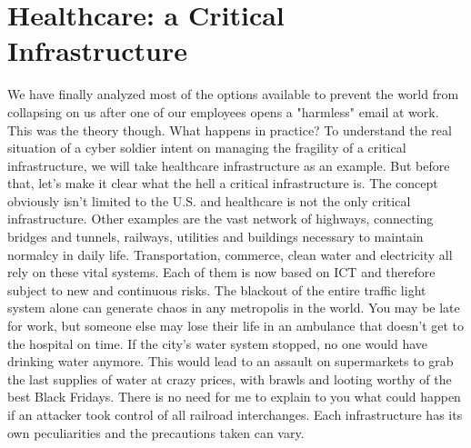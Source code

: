\chapter{Healthcare: a Critical Infrastructure}
We have finally analyzed most of the options available to prevent the world from collapsing on us after one of our employees opens a "harmless" email at work. This was the theory though. What happens in practice? To understand the real situation of a cyber soldier intent on managing the fragility of a critical infrastructure, we will take healthcare infrastructure as an example. But before that, let's make it clear what the hell a critical infrastructure is.
The concept obviously isn't limited to the U.S. and healthcare is not the only critical infrastructure. Other examples are the vast network of highways, connecting bridges and tunnels, railways, utilities and buildings necessary to maintain normalcy in daily life. Transportation, commerce, clean water and electricity all rely on these vital systems. Each of them is now based on ICT and therefore subject to new and continuous risks. The blackout of the entire traffic light system alone can generate chaos in any metropolis in the world. You may be late for work, but someone else may lose their life in an ambulance that doesn't get to the hospital on time. If the city's water system stopped, no one would have drinking water anymore. This would lead to an assault on supermarkets to grab the last supplies of water at crazy prices, with brawls and looting worthy of the best Black Fridays. There is no need for me to explain to you what could happen if an attacker took control of all railroad interchanges. Each infrastructure has its own peculiarities and the precautions taken can vary.
